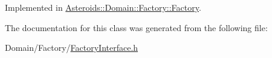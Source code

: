 Implemented in \hyperlink{classAsteroids_1_1Domain_1_1Factory_1_1Factory_acb69fddf282eda975e582394dde7e7f6}{Asteroids\+::\+Domain\+::\+Factory\+::\+Factory}.



The documentation for this class was generated from the following file\+:\begin{DoxyCompactItemize}
\item 
Domain/\+Factory/\hyperlink{FactoryInterface_8h}{Factory\+Interface.\+h}\end{DoxyCompactItemize}
